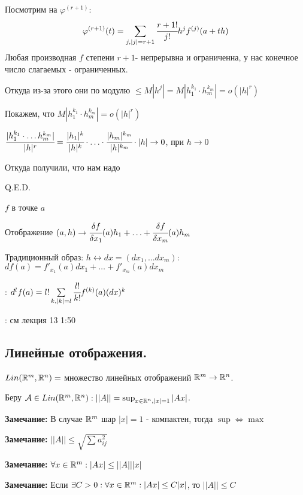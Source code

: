 Посмотрим на $\varphi^{(r+1)}$: 
$$\varphi^{(r+1)}(t) = \sum\limits_{j,|j| = r+1} \cfrac{r+1!}{j!} h^j f^{(j)}(a+th)$$
Любая производная $f$ степени $r+1$- непрерывна и ограниченна,  у нас конечное число слагаемых - ограниченных. 

Откуда из-за этого они по модулю $\leq M|h^j|=M |h_1^{k_1}\cdot h_m^{k_m}| = o(|h|^r)$

Покажем, что $M |h_1^{k_1}\cdot h_m^{k_m}| = o(|h|^r)$

$\cfrac{|h_1^{k_1}\cdot \ldots h_m^{k_m}|}{|h|^r} = \cfrac{|h_1|^k}{|h|^k}\cdot \ldots \cdot \cfrac{|h_m|^{k_m}}{|h|^{k_m}}\cdot |h| \rightarrow 0$, при $h\rightarrow 0$

Откуда получили, что нам надо

\hfill Q.E.D.

  $f$ в точке $a$

Отображение $(a,h) \rightarrow \cfrac{\delta f}{\delta x_1}(a) h_1 + \ldots + \cfrac{\delta f}{\delta x_m}(a) h_m$

Традиционный образ: $h \leftrightarrow dx = (dx_1,\ldots dx_m)$: $df(a) = f'_{x_1}(a)dx_1 + \ldots + f'_{x_m}(a)dx_m$

: $d^lf(a)= l! \sum\limits_{k, |k| = l}\cfrac{l!}{k!}f^{(k)}(a)(dx)^k$

: см лекция 13 1:50


\pagebreak

\subsection{Линейные отображения.}

 $Lin(\mathbb{R}^m, \mathbb{R}^n ) = $ множество линейных отображений $\mathbb{R}^m \rightarrow \mathbb{R}^n$.

Беру $\mathcal{A} \in Lin(\mathbb{R}^m, \mathbb{R}^n): ||A|| = \sup_{x\in \mathbb{R}^n, |x| =1}|Ax|$.

\textbf{Замечание:} В случае $\mathbb{R}^m$ шар $|x| =1$ - компактен, тогда $\sup \Leftrightarrow \max$

\textbf{Замечание:} $||A|| \leq \sqrt{\sum\limits_{}a_{ij}^2}$

\textbf{Замечание:} $\forall x \in \mathbb{R}^m: |Ax|\leq ||A|| |x|$

\textbf{Замечание:} Если $\exists C >0: \forall x \in \mathbb{R}^m: |Ax|\leq C|x|$, то $||A|| \leq C$


